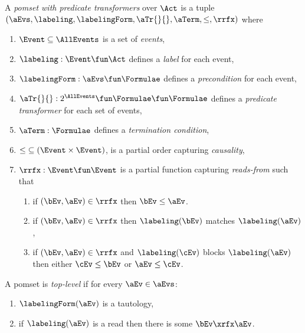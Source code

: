 \begin{definition}
  \label{def:pomset}
  A \emph{pomset with predicate transformers} over $\Act$
  is a tuple $(\aEvs, \labeling, \labelingForm, \aTr{}{}, \aTerm, {\le}, {\rrfx})$ where
  \begin{enumerate}[,label=(\textsc{m}\arabic*),ref=\textsc{m}\arabic*]
  \item \label{pom-E}
    $\Event\subseteq\AllEvents$ is a set of \emph{events},
  \item \label{pom-lambda}
    $\labeling: \Event \fun \Act$ defines a \emph{label} for each event,
  \item \label{pom-kappa}
    $\labelingForm:\aEvs\fun\Formulae$ defines a \emph{precondition} for each event,
  \item \label{pom-tau}
    $\aTr{}{}:2^{\AllEvents}\fun\Formulae \fun\Formulae$ defines a \emph{predicate transformer} for each set of events,
  \item \label{pom-term}
    $\aTerm:\Formulae$ defines a \emph{termination condition},
  \item \label{pom-le}
    ${\le} \subseteq (\Event\times\Event)$, is a partial order capturing \emph{causality},
  \item \label{pom-rf}
    ${\rrfx} : \Event\fun\Event$ is a partial function capturing \emph{reads-from} such that 
    \begin{enumerate}
    \item \label{pom-rf-le}
      if $(\bEv,\aEv)\in{\rrfx}$ then $\bEv\le\aEv$.
    \item \label{pom-rf-match}
      if $(\bEv,\aEv)\in{\rrfx}$ then $\labeling(\bEv)$ matches $\labeling(\aEv)$,
    \item \label{pom-rf-block}
      if $(\bEv,\aEv)\in{\rrfx}$ and $\labeling(\cEv)$ blocks
      $\labeling(\aEv)$ then either $\cEv\le\bEv$ or $\aEv\le\cEv$.
    \end{enumerate}
  \end{enumerate}
\end{definition}

\begin{definition}
  A pomset is \emph{top-level} if for every $\aEv\in\aEvs$:
  \begin{enumerate}[,label=(\textsc{t}\arabic*),ref=\textsc{t}\arabic*]
  \item \label{pom-top-true}
    $\labelingForm(\aEv)$ is a tautology,    
  \item \label{pom-top-rf}
    if $\labeling(\aEv)$ is a read then there is some $\bEv\xrfx\aEv$.
  \end{enumerate}
\end{definition}

